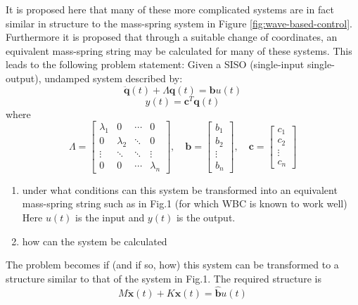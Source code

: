 \documentclass{mbd_fullpaper}
\begin{document}
It is proposed here that many of these more complicated systems are in fact similar in structure to the mass-spring system in Figure \ref{fig:wave-based-control}.
Furthermore it is proposed that through a suitable change of coordinates, an equivalent mass-spring string may be calculated for many of these systems.
This leads to the following problem statement:
Given a SISO (single-input single-output), undamped system described by:
\begin{equation}
\ddot{\mathbf{q}}(t) + \Lambda\mathbf{q}(t) = \mathbf{b}u(t)
\label{eq:modal1}
\end{equation}
\begin{equation}
y(t) = \mathbf{c}^T \mathbf{q}(t)
\label{eq:modal2}
\end{equation}
where
\begin{equation}
\Lambda = \begin{bmatrix}
\lambda_1  &  0 & \cdots & 0 \\
0 & \lambda_2  & \ddots & 0 \\
\vdots & \ddots & \ddots & \vdots \\
0 & 0 & \cdots & \lambda_n \end{bmatrix}
,\quad \mathbf{b} = \begin{bmatrix} b_1 \\ b_2 \\ \vdots \\ b_n \end{bmatrix}
,\quad \mathbf{c} = \begin{bmatrix} c_1 \\ c_2 \\ \vdots \\ c_n \end{bmatrix}
\end{equation}
\begin{enumerate}
\item under what conditions can this system be transformed into an equivalent mass-spring string such as in Fig.1 (for which WBC is known to work well) Here $u(t)$ is the input and $y(t)$ is the output.
\item how can the system be calculated
\end{enumerate}
The problem becomes if (and if so, how) this system can be transformed to a structure similar to that of the system in Fig.1.
The required structure is
\begin{equation}
M\ddot{\mathbf{x}}(t) + K\mathbf{x}(t) = \mathbf{\hat{b}}u(t)
\label{eq:eom1}
\end{equation}
\end{document}
